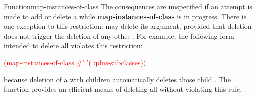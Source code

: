 \documentclass[10pt,twoside,english,pdftex]{article}
\begin{document}
\begin{functiondoc}{Function}{map-instances-of-class}
\fnnote
{}%
%
%
The consequences are unspecified if an attempt is made to add or delete a
 while \textbf{map-instances-of-class} is in progress.
There is one exception to this restriction:  may delete its
 argument, provided that deletion does not trigger the
deletion of any other .  For example, the following form
intended to delete all  violates this restriction:
%
\W\supp
\begin{example}
   \textcolor{red}{(map-instances-of-class 
     #' '( :plus-subclasses))}
\end{example}
%
because deletion of a  with children automatically
deletes those child .  The function
\textbf{} provides an efficient means of
deleting all  without violating this rule.

\end{functiondoc}

\end{document}
